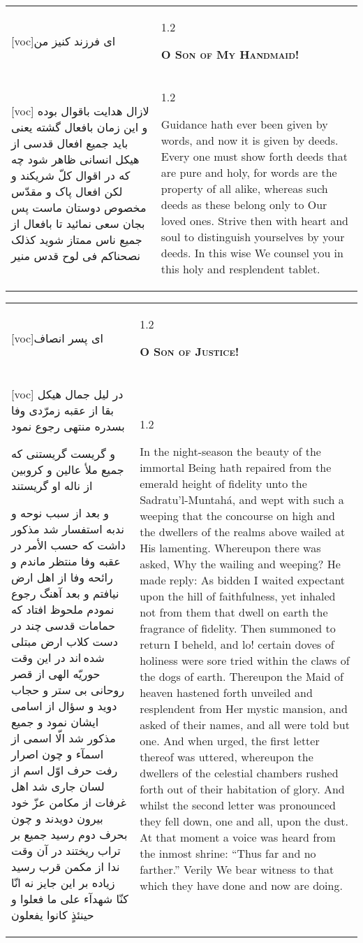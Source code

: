 \documentclass[11pt]{article}
\makeatletter
\newenvironment{orig}
  {\begin{farsi}[voc]}
  {\end{farsi}}
\newenvironment{trans}
  {\Large\begin{spacing}{1.2}\raggedright}
  {\end{spacing}}
\newenvironment{word}
  {\begin{tabular}[t]{p{2.75in}@{\hspace{3em}}p{2.75in}}}
  {\end{tabular}}
\newcommand{\ayat}[2]{\begin{orig}#1\end{orig} & \begin{trans}#2\end{trans}}
\newcommand{\heading}[2]{\textsc{\textbf{#1}} %
}
\makeatother
\begin{document}
\pagebreak

\begin{word}
\ayat{ای فرزند کنيز من}{\heading{O Son of My Handmaid!}{}} \\ \ayat{
لازال هدايت باقوال بوده و اين زمان بافعال گشته
يعنی بايد جميع افعال قدسی از هيکل انسانی ظاهر شود چه که در اقوال کلّ شريکند و لکن افعال پاک و مقدّس مخصوص دوستان ماست
پس بجان سعی نمائيد تا بافعال از جميع ناس ممتاز شويد
کذلک نصحناکم فی لوح قدس منير
}{
  Guidance hath ever been given by words, and now it is given by deeds. Every
  one must show forth deeds that are pure and holy, for words are the property
  of all alike, whereas such deeds as these belong only to Our loved ones.
  Strive then with heart and soul to distinguish yourselves by your deeds. In
  this wise We counsel you in this holy and resplendent tablet.
}
\end{word}

\pagebreak

\begin{word}
\ayat{ای پسر انصاف}{\heading{O Son of Justice!}{}} \\ \ayat{
در ليل جمال هيکل بقا از عقبه زمرّدی وفا بسدره منتهی رجوع نمود

و گريست گريستنی که جميع ملأ عالين و کروبين از ناله او گريستند

و بعد از سبب نوحه و ندبه استفسار شد مذکور داشت که حسب الأمر در عقبه وفا منتظر ماندم و رائحه وفا از اهل ارض نيافتم و بعد آهنگ رجوع نمودم ملحوظ افتاد که حمامات قدسی چند در دست کلاب ارض مبتلی شده اند
در اين وقت حوريّه الهی از قصر روحانی بی ستر و حجاب دويد و سؤال از اسامی ايشان نمود و جميع مذکور شد الّا اسمی از اسمآء
و چون اصرار رفت حرف اوّل اسم از لسان جاری شد اهل غرفات از مکامن عزّ خود بيرون دويدند و چون بحرف دوم رسيد جميع بر تراب ريختند در آن وقت ندا از مکمن قرب رسيد زياده بر اين جايز نه انّا کنّا شهدآء علی ما فعلوا و حينئذٍ کانوا يفعلون
}{
  In the night-season the beauty of the immortal Being hath repaired from the
  emerald height of fidelity unto the Sadratu'l-Muntahá, and wept with such a
  weeping that the concourse on high and the dwellers of the realms above
  wailed at His lamenting. Whereupon there was asked, Why the wailing and
  weeping? He made reply: As bidden I waited expectant upon the hill of
  faithfulness, yet inhaled not from them that dwell on earth the fragrance of
  fidelity. Then summoned to return I beheld, and lo! certain doves of
  holiness were sore tried within the claws of the dogs of earth. Thereupon
  the Maid of heaven hastened forth unveiled and resplendent from Her mystic
  mansion, and asked of their names, and all were told but one. And when
  urged, the first letter thereof was uttered, whereupon the dwellers of the
  celestial chambers rushed forth out of their habitation of glory. And whilst
  the second letter was pronounced they fell down, one and all, upon the dust.
  At that moment a voice was heard from the inmost shrine: ``Thus far and no
  farther.'' Verily We bear witness to that which they have done and now are
  doing.
}
\end{word}
\end{document}
